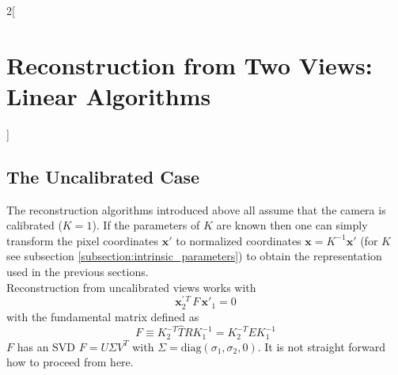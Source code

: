 \documentclass[oneside,fontsize=11pt,paper=a4]{scrartcl}
\begin{document}
\begin{multicols}{2}[\section{Reconstruction from Two Views: Linear Algorithms}]
\subsection{The Uncalibrated Case} \label{ssec:the_uncalibrated_case}
The reconstruction algorithms introduced above all assume that the camera is calibrated ($K = 1$). If the parameters of $K$ are known then one can simply transform the pixel coordinates $\boldsymbol{x}'$ to normalized coordinates $\boldsymbol{x} = K^{-1} \boldsymbol{x}'$ (for $K$ see subsection \ref{subsection:intrinsic_parameters}) to obtain the representation used in the previous sections.\\
Reconstruction from uncalibrated views works with 
\begin{equation*}
    \boldsymbol{x}_2^{' \, T} \, F \, \boldsymbol{x}'_1 = 0
\end{equation*}
with the fundamental matrix defined as
\begin{equation*}
    F \equiv K_2^{-T} \hat{T} R K_1^{-1} = K_2^{-T} E K_1^{-1}
\end{equation*}
$F$ has an SVD $F = U \Sigma V^T$ with $\Sigma = \text{diag}(\sigma_1, \sigma_2, 0)$.
It is not straight forward how to proceed from here.
\end{multicols}
\end{document}
